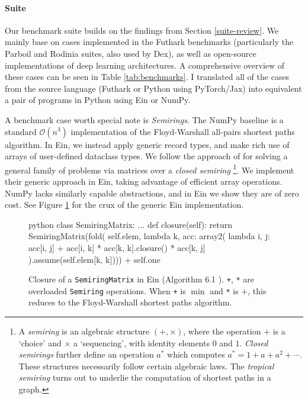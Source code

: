 \paragraph{Suite} Our benchmark suite builds on the findings from Section \ref{suite-review}. We mainly base on cases implemented in the Futhark benchmarks \cite{The_Futhark_Hackers_futhark-benchmarks} (particularly the Parboil and Rodinia suites, also used by Dex), as well as open-source implementations of deep learning architectures.
A comprehensive overview of these cases can be seen in Table \ref{tab:benchmarks}. I translated all of the cases from the source language (Futhark or Python using PyTorch/Jax) into equivalent a pair of programs in Python using Ein or NumPy.

A benchmark case worth special note is \textit{Semirings}. 
The NumPy baseline is a standard $\mathcal O(n^3)$ implementation of the Floyd-Warshall all-pairs shortest paths algorithm. 
In Ein, we instead apply generic record types, and make rich use of arrays of user-defined dataclass types. 
We follow the approach of \textcite{dolan2013fun} for solving a general family of problems via matrices over a \textit{closed semiring}%
\footnote{A \textit{semiring} is an algebraic structure $(+, \times)$, where the operation $+$ is a `choice' and $\times$ a `sequencing', with identity elements $0$ and $1$. \textit{Closed semirings} further define an operation $a^*$ which computes $a^* = 1 + a + a^2 + \cdots$. These structures necessarily follow certain algebraic laws. The \textit{tropical semiring} turns out to underlie the computation of shortest paths in a graph.}.
We implement their generic approach in Ein, taking advantage of efficient array operations.
NumPy lacks similarly capable abstractions, and in Ein we show they are of zero cost.
See Figure \ref{fig:semirings} for the crux of the generic Ein implementation.

\begin{figure}
    \centering
\begin{cminted}{python}
class SemiringMatrix:
    ...
    def closure(self):
        return SemiringMatrix(fold(
            self.elem,
            lambda k, acc: array2(
                lambda i, j: acc[i, j] + acc[i, k] * acc[k, k].closure() * acc[k, j]
        ).assume(self.elem[k, k]))) + self.one
\end{cminted}
    \caption{Closure of a \texttt{SemiringMatrix} in Ein (Algorithm 6.1 \cite{abdali1985transitive}). \texttt{+}, \texttt{*} are overloaded \texttt{Semiring} operations. When \texttt{+} is $\min$ and \texttt{*} is $+$, this reduces to the Floyd-Warshall shortest paths algorithm.}
    \label{fig:semirings}
\end{figure}

